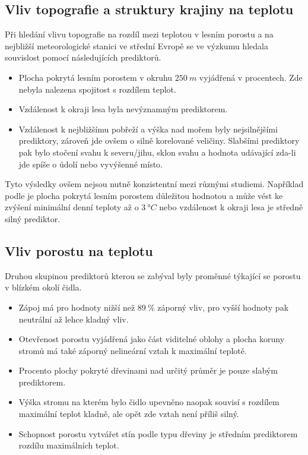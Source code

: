 \subsection{Vliv topografie a struktury krajiny na teplotu}
Při hledání vlivu topografie na rozdíl mezi teplotou v lesním porostu a na nejbližší meteorologické stanici ve střední Evropě se ve výzkumu \cite{ZellwegerFlorian2019Sdou} hledala souvislost pomocí následujících prediktorů.

\begin{itemize}
	\item Plocha pokrytá lesním porostem v okruhu $\SI{250}{m}$ vyjádřená v procentech. Zde nebyla nalezena spojitost s rozdílem teplot.
	\item Vzdálenost k okraji lesa byla nevýznamným prediktorem. 
	\item Vzdálenost k nejbližšímu pobřeží a výška nad mořem byly nejsilnějšími prediktory, zároveň jde ovšem o silně korelované veličiny. Slabšími prediktory pak bylo stočení svahu k severu/jihu, sklon svahu a hodnota udávající zda-li jde spíše o údolí nebo vyvýšenné místo.
\end{itemize}

Tyto výsledky ovšem nejsou nutně konzistentní mezi různými studiemi. Například podle \cite{GreiserCaroline2018Mmmi} je plocha pokrytá lesním porostem důležitou hodnotou a může vést ke zvýšení minimální denní teploty až o $\SI{3}{\degree C}$ nebo vzdálenost k okraji lesa je středně silný prediktor.

\subsection{Vliv porostu na teplotu}
Druhou skupinou prediktorů kterou se \cite{ZellwegerFlorian2019Sdou} zabýval byly proměnné týkající se porostu v blízkém okolí čidla.

\begin{itemize}
	\item Zápoj má pro hodnoty nižší než $\SI{89}{\%}$ záporný vliv, pro vyšší hodnoty pak neutrální až lehce kladný vliv.
	\item Otevřenost porostu vyjádřená jako část viditelné oblohy a plocha koruny stromů má také záporný nelineární vztah k maximální teplotě.
	\item Procento plochy pokryté dřevinami nad určitý průměr je pouze slabým prediktorem. 
	\item Výška stromu na kterém bylo čidlo upevněno naopak souvisí s rozdílem maximální teplot kladně, ale opět zde vztah není příliš silný.
	\item Schopnost porostu vytvářet stín podle typu dřeviny je středním prediktorem rozdílu maximálních teplot.
\end{itemize}

